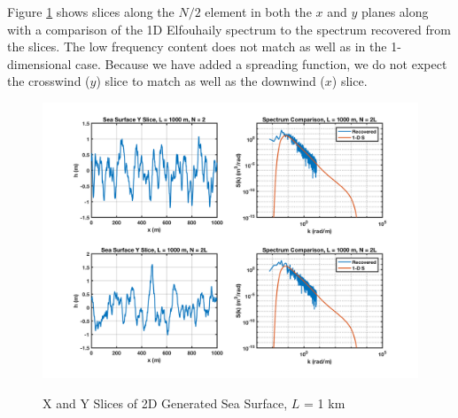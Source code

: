 Figure \ref{os_fig:10} shows slices along the $N/2$ element in both the $x$ and $y$ planes along with a comparison of the 1D Elfouhaily spectrum to the spectrum recovered from the slices. The low frequency content does not match as well as in the 1-dimensional case. Because we have added a spreading function, we do not expect the crosswind ($y$) slice to match as well as the downwind ($x$) slice.
\begin{figure}[H]
  \begin{center}
\includegraphics[width=6in]{../media/Ocean_Surface/sea_surface_2d_slices1000.png}
  \end{center}
  \renewcommand{\baselinestretch}{1} \small\normalsize
  \begin{quote}
    \caption[X and Y Slices of 2D Generated Sea Surface, $L$ = 1 km]{X and Y Slices of 2D Generated Sea Surface, $L$ = 1 km\label{os_fig:10}}
  \end{quote}
\end{figure}
\renewcommand{\baselinestretch}{2} \small\normalsize

